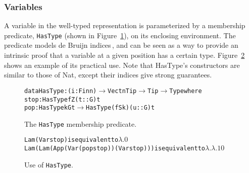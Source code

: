 \subsubsection{Variables}

A variable in the well-typed representation is parameterized by a membership predicate, \texttt{HasType} (shown in Figure~\ref{fig:HasType}), on its enclosing environment. The predicate models de Bruijn indices\,\cite{Bruijn72lambdacalculus}, and can be seen as a way to provide an intrinsic proof that a variable at a given position has a certain type. Figure~\ref{fig:HasType-use} shows an example of its practical use. Note that HasType's constructors are similar to those of Nat, except their indices give strong guarantees.

\begin{figure}
\begin{alltt}
  data HasType : (i : Fin n) \(\rightarrow\) Vect n Tip \(\rightarrow\) Tip \(\rightarrow\) Type where
    stop : HasType fZ (t :: G) t
    pop  : HasType k G t \(\rightarrow\) HasType (fS k) (u :: G) t
\end{alltt}
\caption{The \texttt{HasType} membership predicate.}
\label{fig:HasType}
\end{figure}

\begin{figure}
\begin{alltt}
  Lam (Var stop)                              is equivalent to \(\lambda.0\)
  Lam (Lam (App (Var (pop stop)) (Var stop))) is equivalent to \(\lambda.\lambda.1 0\)
\end{alltt}
\caption{Use of \texttt{HasType}.}
\label{fig:HasType-use}
\end{figure}

